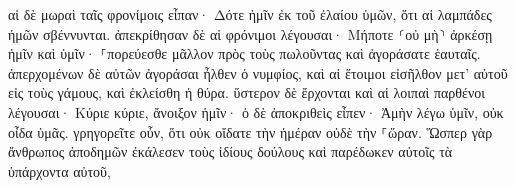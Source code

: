 \documentclass{openreader}
\begin{document}
αἱ δὲ μωραὶ ταῖς φρονίμοις εἶπαν· Δότε ἡμῖν ἐκ τοῦ ἐλαίου ὑμῶν, ὅτι αἱ λαμπάδες ἡμῶν σβέννυνται. 
ἀπεκρίθησαν δὲ αἱ φρόνιμοι λέγουσαι· Μήποτε ⸂οὐ μὴ⸃ ἀρκέσῃ ἡμῖν καὶ ὑμῖν· ⸀πορεύεσθε μᾶλλον πρὸς τοὺς πωλοῦντας καὶ ἀγοράσατε ἑαυταῖς. 
ἀπερχομένων δὲ αὐτῶν ἀγοράσαι ἦλθεν ὁ νυμφίος, καὶ αἱ ἕτοιμοι εἰσῆλθον μετ’ αὐτοῦ εἰς τοὺς γάμους, καὶ ἐκλείσθη ἡ θύρα. 
ὕστερον δὲ ἔρχονται καὶ αἱ λοιπαὶ παρθένοι λέγουσαι· Κύριε κύριε, ἄνοιξον ἡμῖν· 
ὁ δὲ ἀποκριθεὶς εἶπεν· Ἀμὴν λέγω ὑμῖν, οὐκ οἶδα ὑμᾶς. 
γρηγορεῖτε οὖν, ὅτι οὐκ οἴδατε τὴν ἡμέραν οὐδὲ τὴν ⸀ὥραν. 
Ὥσπερ γὰρ ἄνθρωπος ἀποδημῶν ἐκάλεσεν τοὺς ἰδίους δούλους καὶ παρέδωκεν αὐτοῖς τὰ ὑπάρχοντα αὐτοῦ, 
\end{document}
